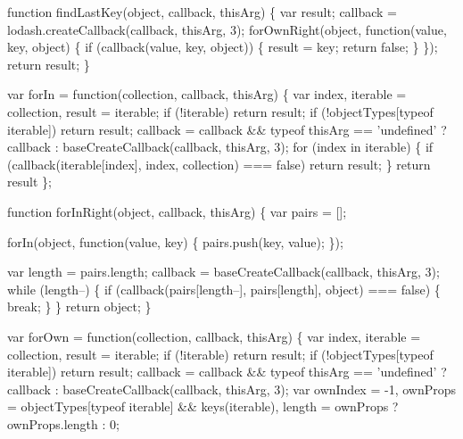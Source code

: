 \begin{DoxyCodeInclude}
    \textcolor{keyword}{function} findLastKey(\textcolor{keywordtype}{object}, callback, thisArg) \{
      var result;
      callback = lodash.createCallback(callback, thisArg, 3);
      forOwnRight(\textcolor{keywordtype}{object}, \textcolor{keyword}{function}(value, key, \textcolor{keywordtype}{object}) \{
        \textcolor{keywordflow}{if} (callback(value, key, \textcolor{keywordtype}{object})) \{
          result = key;
          \textcolor{keywordflow}{return} \textcolor{keyword}{false};
        \}
      \});
      \textcolor{keywordflow}{return} result;
    \}

    var forIn = \textcolor{keyword}{function}(collection, callback, thisArg) \{
      var index, iterable = collection, result = iterable;
      \textcolor{keywordflow}{if} (!iterable) \textcolor{keywordflow}{return} result;
      \textcolor{keywordflow}{if} (!objectTypes[typeof iterable]) \textcolor{keywordflow}{return} result;
      callback = callback && typeof thisArg == \textcolor{stringliteral}{'undefined'} ? callback : baseCreateCallback(callback, 
      thisArg, 3);
        \textcolor{keywordflow}{for} (index in iterable) \{
          \textcolor{keywordflow}{if} (callback(iterable[index], index, collection) === \textcolor{keyword}{false}) \textcolor{keywordflow}{return} result;
        \}
      \textcolor{keywordflow}{return} result
    \};

    \textcolor{keyword}{function} forInRight(\textcolor{keywordtype}{object}, callback, thisArg) \{
      var pairs = [];

      forIn(\textcolor{keywordtype}{object}, \textcolor{keyword}{function}(value, key) \{
        pairs.push(key, value);
      \});

      var length = pairs.length;
      callback = baseCreateCallback(callback, thisArg, 3);
      \textcolor{keywordflow}{while} (length--) \{
        \textcolor{keywordflow}{if} (callback(pairs[length--], pairs[length], \textcolor{keywordtype}{object}) === \textcolor{keyword}{false}) \{
          \textcolor{keywordflow}{break};
        \}
      \}
      \textcolor{keywordflow}{return} object;
    \}

    var forOwn = \textcolor{keyword}{function}(collection, callback, thisArg) \{
      var index, iterable = collection, result = iterable;
      \textcolor{keywordflow}{if} (!iterable) \textcolor{keywordflow}{return} result;
      \textcolor{keywordflow}{if} (!objectTypes[typeof iterable]) \textcolor{keywordflow}{return} result;
      callback = callback && typeof thisArg == \textcolor{stringliteral}{'undefined'} ? callback : baseCreateCallback(callback, 
      thisArg, 3);
        var ownIndex = -1,
            ownProps = objectTypes[typeof iterable] && keys(iterable),
            length = ownProps ? ownProps.length : 0;


\end{DoxyCodeInclude}
